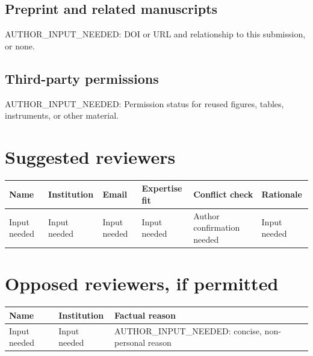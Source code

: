 \documentclass[10pt]{article}
\begin{document}
\subsection*{Preprint and related manuscripts}
AUTHOR\_INPUT\_NEEDED: DOI or URL and relationship to this submission, or none.

\subsection*{Third-party permissions}
AUTHOR\_INPUT\_NEEDED: Permission status for reused figures, tables, instruments, or other material.

\section*{Suggested reviewers}

\begin{longtable}{>{\raggedright\arraybackslash}p{}
                  >{\raggedright\arraybackslash}p{}
                  >{\raggedright\arraybackslash}p{}
                  >{\raggedright\arraybackslash}p{}
                  >{\raggedright\arraybackslash}p{}
                  >{\raggedright\arraybackslash}p{}}
\textbf{Name} & \textbf{Institution} & \textbf{Email} &
\textbf{Expertise fit} & \textbf{Conflict check} & \textbf{Rationale}\\
\hline
Input needed & Input needed & Input needed &
Input needed & Author confirmation needed & Input needed\\
\end{longtable}

\section*{Opposed reviewers, if permitted}

\begin{longtable}{>{\raggedright\arraybackslash}p{}
                  >{\raggedright\arraybackslash}p{}
                  >{\raggedright\arraybackslash}p{}}
\textbf{Name} & \textbf{Institution} & \textbf{Factual reason}\\
\hline
Input needed & Input needed &
AUTHOR\_INPUT\_NEEDED: concise, non-personal reason\\
\end{longtable}
\end{document}
